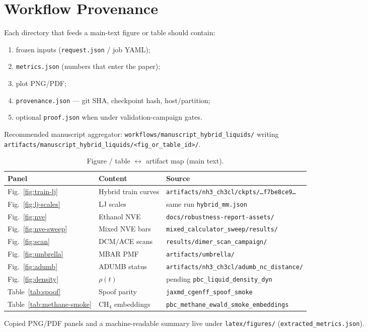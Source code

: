 \documentclass[journal=jctc,manuscript=article]{achemso}
\begin{document}
\section{Workflow Provenance}
\label{si:provenance}

Each directory that feeds a main-text figure or table should contain:
\begin{enumerate}
\item frozen inputs (\texttt{request.json} / job YAML);
\item \texttt{metrics.json} (numbers that enter the paper);
\item plot PNG/PDF;
\item \texttt{provenance.json} --- git SHA, checkpoint hash, host/partition;
\item optional \texttt{proof.json} when under validation-campaign gates.
\end{enumerate}
Recommended manuscript aggregator: \texttt{workflows/manuscript\_hybrid\_liquids/}
writing \texttt{artifacts/manuscript\_hybrid\_liquids/<fig\_or\_table\_id>/}.

\begin{table}[h]
\caption{Figure / table \(\leftrightarrow\) artifact map (main text).}
\label{tab:si-map}
\begin{tabular}{llp{5.2cm}}
\toprule
Panel & Content & Source \\
\midrule
Fig.~\ref{fig:train-lj} & Hybrid train curves & \texttt{artifacts/nh3\_ch3cl/ckpts/…f7be8ce9…} \\
Fig.~\ref{fig:lj-scales} & LJ scales & same run \texttt{hybrid\_mm.json} \\
Fig.~\ref{fig:nve} & Ethanol NVE & \texttt{docs/robustness-report-assets/} \\
Fig.~\ref{fig:nve-sweep} & Mixed NVE bars & \texttt{mixed\_calculator\_sweep/results/} \\
Fig.~\ref{fig:scan} & DCM/ACE scans & \texttt{results/dimer\_scan\_campaign/} \\
Fig.~\ref{fig:umbrella} & MBAR PMF & \texttt{artifacts/umbrella/} \\
Fig.~\ref{fig:adumb} & ADUMB status & \texttt{artifacts/nh3\_ch3cl/adumb\_nc\_distance/} \\
Fig.~\ref{fig:density} & \(\rho(t)\) & pending \texttt{pbc\_liquid\_density\_dyn} \\
Table~\ref{tab:spoof} & Spoof parity & \texttt{jaxmd\_cgenff\_spoof\_smoke} \\
Table~\ref{tab:methane-smoke} & CH\(_4\) embeddings & \texttt{pbc\_methane\_ewald\_smoke\_embeddings} \\
\bottomrule
\end{tabular}
\end{table}

Copied PNG/PDF panels and a machine-readable summary live under
\texttt{latex/figures/} (\texttt{extracted\_metrics.json}).

\FloatBarrier

\clearpage

\end{document}
